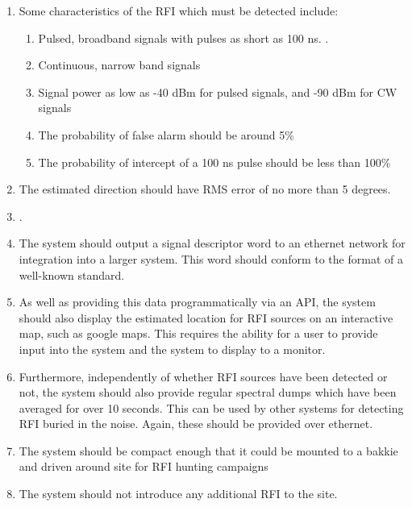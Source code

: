 \begin{enumerate}
  \item Some characteristics of the RFI which must be detected include:
  \begin{enumerate}
    \item Pulsed, broadband signals with pulses as short as 100 ns. .
    \item Continuous, narrow band signals
    \item Signal power as low as -40 dBm for pulsed signals, and -90 dBm for CW signals
    \item The probability of false alarm should be around 5\% 
    \item The probability of intercept of a 100 ns pulse should be less than 100\%
  \end{enumerate}

  \item The estimated direction should have RMS error of no more than 5 degrees.
    
  \item . 

  \item The system should output a signal descriptor word to an ethernet network for integration into a larger system.  This word should conform to the format of a well-known standard.

  \item As well as providing this data programmatically via an API, the system should also display the estimated location for RFI sources on an interactive map, such as google maps. This requires the ability for a user to provide input into the system and the system to display to a monitor. 

  \item Furthermore, independently of whether RFI sources have been detected or not, the system should also provide regular spectral dumps which have been averaged for over 10 seconds. This can be used by other systems for detecting RFI buried in the noise. Again, these should be provided over ethernet.

  \item The system should be compact enough that it could be mounted to a bakkie and driven around site for RFI hunting campaigns

  \item The system should not introduce any additional RFI to the site.
\end{enumerate}
